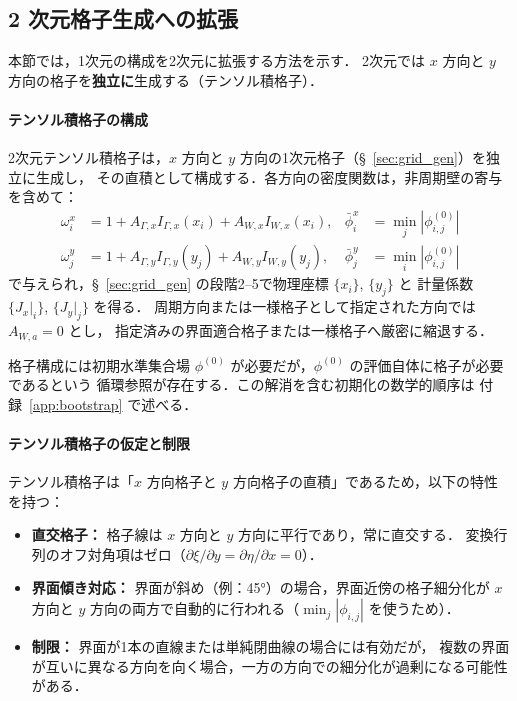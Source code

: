 \subsection{2 次元格子生成への拡張}
\label{sec:grid_2d}

本節では，1次元の構成を2次元に拡張する方法を示す．
2次元では $x$ 方向と $y$ 方向の格子を\textbf{独立に}生成する（テンソル積格子）．

\paragraph{テンソル積格子の構成}

2次元テンソル積格子は，$x$ 方向と $y$ 方向の1次元格子（§~\ref{sec:grid_gen}）を独立に生成し，
その直積として構成する．各方向の密度関数は，非周期壁の寄与を含めて：
\begin{align*}
  \omega^x_i &= 1 + A_{\Gamma,x} I_{\Gamma,x}(x_i) + A_{W,x}I_{W,x}(x_i), &
  \bar{\phi}^x_i &= \min_j |\phi^{(0)}_{i,j}| \\
  \omega^y_j &= 1 + A_{\Gamma,y} I_{\Gamma,y}(y_j) + A_{W,y}I_{W,y}(y_j), &
  \bar{\phi}^y_j &= \min_i |\phi^{(0)}_{i,j}|
\end{align*}
で与えられ，§~\ref{sec:grid_gen} の段階2--5で物理座標 $\{x_i\}$, $\{y_j\}$ と
計量係数 $\{J_x|_i\}$, $\{J_y|_j\}$ を得る．
周期方向または一様格子として指定された方向では $A_{W,a}=0$ とし，
指定済みの界面適合格子または一様格子へ厳密に縮退する．

格子構成には初期水準集合場 $\phi^{(0)}$ が必要だが，$\phi^{(0)}$ の評価自体に格子が必要であるという
循環参照が存在する．この解消を含む初期化の数学的順序は
付録~\ref{app:bootstrap} で述べる．

\paragraph{テンソル積格子の仮定と制限}
テンソル積格子は「$x$ 方向格子と $y$ 方向格子の直積」であるため，以下の特性を持つ：
\begin{itemize}
  \item \textbf{直交格子：} 格子線は $x$ 方向と $y$ 方向に平行であり，常に直交する．
        変換行列のオフ対角項はゼロ（$\partial\xi/\partial y = \partial\eta/\partial x = 0$）．
  \item \textbf{界面傾き対応：} 界面が斜め（例：45°）の場合，界面近傍の格子細分化が
        $x$ 方向と $y$ 方向の両方で自動的に行われる（$\min_j|\phi_{i,j}|$ を使うため）．
  \item \textbf{制限：} 界面が1本の直線または単純閉曲線の場合には有効だが，
        複数の界面が互いに異なる方向を向く場合，一方の方向での細分化が過剰になる可能性がある．
\end{itemize}


